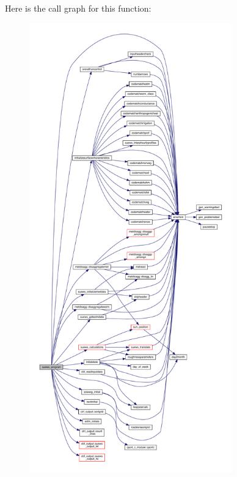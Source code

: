 Here is the call graph for this function\+:\nopagebreak
\begin{figure}[H]
\begin{center}
\leavevmode
\includegraphics[height=550pt]{_s_u_e_w_s___program_8f95_af3ded34edb3421ec79e0e64b46b76542_cgraph}
\end{center}
\end{figure}
